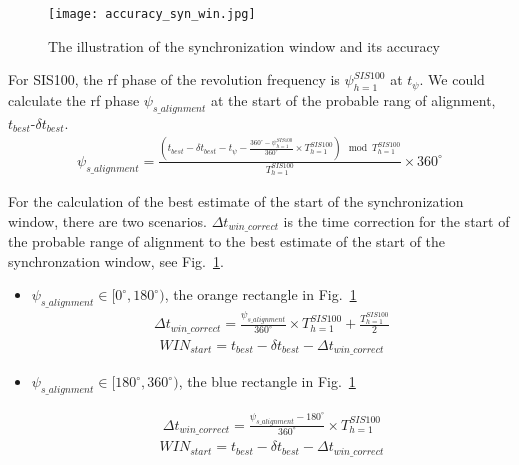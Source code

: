 \begin{figure}[!htb]
   \centering   
   \texttt{[image: accuracy\_syn\_win.jpg]}
   \caption{The illustration of the synchronization window and its accuracy}
   \label{accuracy_syn_win}
\end{figure}

For SIS100, the rf phase of the revolution frequency is $\psi_{h=1}^{SIS100}$ at $t_{\psi}$. We could calculate the rf phase $\psi_{s\_ alignment}$ at the start of the probable rang of alignment, $t_{best}$-$\delta t_{best}$.
\begin{equation}
\begin{aligned}
\psi_{s\_ alignment}=\frac{(t_{best}-\delta t_{best}-t_{\psi}- \frac{360^\circ-\psi_{h=1}^{SIS100}}{360^\circ} \times {T_{h=1}^{SIS100}}) \mod T_{h=1}^{SIS100}}{T_{h=1}^{SIS100}}\times {360^\circ} 
\label{phase_after_syn}
\end{aligned}
\end{equation}

For the calculation of the best estimate of the start of the synchronization window, there are two scenarios. $\Delta t_{win \_ correct}$ is the time correction for the start of the probable range of alignment to the best estimate of the start of the synchronzation window, see Fig.~\ref{accuracy_syn_win}.
\begin{itemize}
\item $\psi_{s\_ alignment}\in [0^\circ,180^\circ)$, the orange rectangle in Fig.~\ref{accuracy_syn_win}
\begin{equation}
\begin{aligned}
\Delta t_{win \_ correct}=\frac{\psi_{s\_ alignment}}{360^\circ}\times T_{h=1}^{SIS100}+\frac{T_{h=1}^{SIS100}}{2}
\end{aligned}
\end{equation}
\begin{equation}
\begin{aligned}
WIN_{start}= t_{best}- \delta t_{best}-\Delta t_{win \_ correct}
\end{aligned}
\end{equation}


\item $\psi_{s\_ alignment}\in [180^\circ,360^\circ)$, the blue rectangle in Fig.~\ref{accuracy_syn_win}

\begin{equation}
\begin{aligned}
\Delta t_{win \_ correct}=\frac{\psi_{s\_ alignment}-180^\circ}{360^\circ}\times T_{h=1}^{SIS100}
\end{aligned}
\end{equation}
\begin{equation}
\begin{aligned}
WIN_{start}= t_{best}- \delta t_{best}-\Delta t_{win \_ correct}
\end{aligned}
\end{equation}

\end{itemize}

